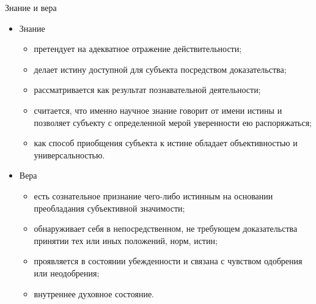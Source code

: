 Знание и вера
\begin{itemize}
    \item Знание
    \begin{itemize}
        \item претендует на адекватное отражение действительности;
        \item делает истину доступной для субъекта посредством доказательства;
        \item рассматривается как результат познавательной деятельности;
        \item считается, что именно научное знание говорит от имени истины и позволяет субъекту с 
            определенной мерой уверенности ею распоряжаться;
        \item как способ приобщения субъекта к истине обладает объективностью и универсальностью.
    \end{itemize}
    \item Вера
    \begin{itemize}
        \item есть сознательное признание чего-либо истинным на основании преобладания субъективной 
            значимости;
        \item обнаруживает себя в непосредственном, не требующем доказательства принятии тех или иных 
            положений, норм, истин;
        \item проявляется в состоянии убежденности и связана с чувством одобрения или неодобрения;
        \item внутреннее духовное состояние.
    \end{itemize}
\end{itemize}